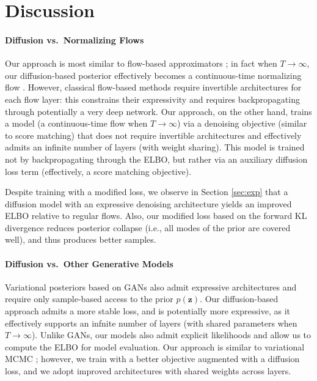 \documentclass[letterpaper]{article} %
\newcommand{\bz}{\mathbf{z}}
\begin{document}
% 
% 
% 
% 
\section{Discussion}


\paragraph{Diffusion vs.~Normalizing Flows}

Our approach is most similar to flow-based approximators \citep{rezende2015variational,kingma2016improved}; in fact when $T \to \infty$, our diffusion-based posterior effectively becomes a continuous-time normalizing flow \citep{song2020denoising}. However, classical flow-based methods require invertible architectures for each flow layer: this constrains their expressivity and requires backpropagating through potentially a very deep network.
%
Our approach, on the other hand, trains a model (a continuous-time flow when $T \to \infty$) via a denoising objective (similar to score matching) that does not require invertible architectures and effectively admits an infinite number of layers (with weight sharing). This model is trained not by backpropagating through the ELBO, but rather via an auxiliary diffusion loss term (effectively, a score matching objective). 

Despite training with a modified loss, we observe in Section \ref{sec:exp} that a diffusion model with an expressive denoising architecture yields an improved ELBO relative to regular flows. Also, our modified loss based on the forward KL divergence reduces posterior collapse (i.e., all modes of the prior are covered well), and thus produces better samples.

\paragraph{Diffusion vs.~Other Generative Models}

Variational posteriors based on GANs \citep{makhzani2015adversarial} also admit expressive architectures and require only sample-based access to the prior $p(\bz)$. Our diffusion-based approach admits a more stable loss, and is potentially more expressive, as it effectively supports an infnite number of layers (with shared parameters when $T\to \infty$). Unlike GANs, our models also admit explicit likelihoods and allow us to compute the ELBO for model evaluation.
Our approach is similar to variational MCMC \citep{salimans2015mcmc}; however, we train with a better objective augmented with a diffusion loss, and we adopt improved architectures with shared weights across layers.
\end{document}
